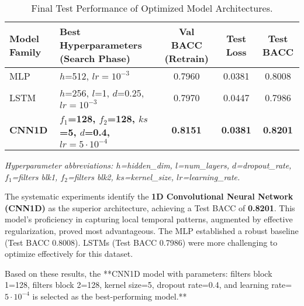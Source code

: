 \documentclass[11pt, a4paper]{article}
\begin{document}
\begin{table}[h!]
\centering
\caption{Final Test Performance of Optimized Model Architectures.}
\label{tab:model_comparison_final}
\begin{tabular}{@{}l p{6.0cm} c c c@{}} 
\toprule
Model Family & Best Hyperparameters (Search Phase) & Val BACC (Retrain) & Test Loss & Test BACC \\ \midrule
MLP    & $h$=512, $lr=10^{-3}$     & 0.7960 & 0.0381 & 0.8008 \\
LSTM   & $h$=256, $l$=1, $d$=0.25, $lr=10^{-3}$ & 0.7970 & 0.0447 & 0.7986 \\
\textbf{CNN1D} & \textbf{$f_1$=128, $f_2$=128, $ks$=5, $d$=0.4, $lr=5\cdot10^{-4}$} & \textbf{0.8151} & \textbf{0.0381} & \textbf{0.8201} \\ \bottomrule
\end{tabular}
\vspace{0.5em} 
\noindent \footnotesize{\textit{Hyperparameter abbreviations: $h$=hidden\_dim, $l$=num\_layers, $d$=dropout\_rate, $f_1$=filters blk1, $f_2$=filters blk2, $ks$=kernel\_size, $lr$=learning\_rate.}}
\end{table}

The systematic experiments identify the \textbf{1D Convolutional Neural Network (CNN1D)} as the superior architecture, achieving a Test BACC of \textbf{0.8201}. This model's proficiency in capturing local temporal patterns, augmented by effective regularization, proved most advantageous. The MLP established a robust baseline (Test BACC 0.8008). LSTMs (Test BACC 0.7986) were more challenging to optimize effectively for this dataset.

Based on these results, the **CNN1D model with parameters: filters block 1=128, filters block 2=128, kernel size=5, dropout rate=0.4, and learning rate=$5 \cdot 10^{-4}$ is selected as the best-performing model.**
\end{document}
